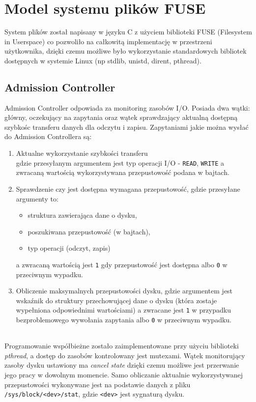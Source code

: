 \section{Model systemu plików FUSE}

System plików został napisany w języku C z użyciem biblioteki FUSE (Filesystem in Userspace) co pozwoliło na 
całkowitą implementację w przestrzeni użytkownika, dzięki czemu możliwe było wykorzystanie
standardowych bibliotek dostępnych w systemie Linux (np stdlib, unistd, dirent, pthread).

\subsection{Admission Controller}\label{acmodule}
Admission Controller odpowiada za monitoring zasobów I/O. Posiada dwa wątki: główny, oczekujący
na zapytania oraz wątek sprawdzający aktualną dostępną szybkośc transferu danych dla odczytu i zapisu. Zapytaniami jakie można wysłać do Admission Controllera są:
\begin{enumerate}
	\item Aktualne wykorzystanie szybkości transferu\\
        gdzie przesyłanym argumentem jest typ operacji I/O - \texttt{READ}, \texttt{WRITE}
        a zwracaną wartością wykorzystywana przepustowość podana w bajtach.
        
    \item Sprawdzenie czy jest dostępna wymagana przepustowość,
        gdzie przesyłane argumenty to:
        \begin{itemize}
        	\item struktura zawierająca dane o dysku,
            \item poszukiwana przepustowość (w bajtach),
            \item typ operacji (odczyt, zapis)
        \end{itemize}
        a zwracaną wartością jest \texttt{1} gdy przepustowość jest dostępna albo
        \texttt{0} w przeciwnym wypadku.
        
    \item Obliczenie maksymalnych przepustowości dysku, gdzie argumentem jest wskaźnik
    do struktury przechowującej dane o dysku (która zostaje wypełniona odpowiednimi
    wartościami) a zwracane jest \texttt{1} w przypadku bezproblemowego wywołania
    zapytania albo \texttt{0} w przeciwnym wypadku.
\end{enumerate}
\ \\ 
Programowanie współbieżne zostało zaimplementowane przy użyciu biblioteki \emph{pthread},
a dostęp do zasobów kontrolowany jest mutexami. Wątek monitorujący zasoby dysku ustawiony ma
\emph{cancel state} dzięki czemu możliwe jest przerwanie jego pracy w dowolnym momencie.
Samo obliczanie aktualnie wykorzystywanej przepustowości wykonywane jest na podstawie
danych z pliku \texttt{/sys/block/<dev>/stat}, gdzie \texttt{<dev>} jest sygnaturą dysku.


